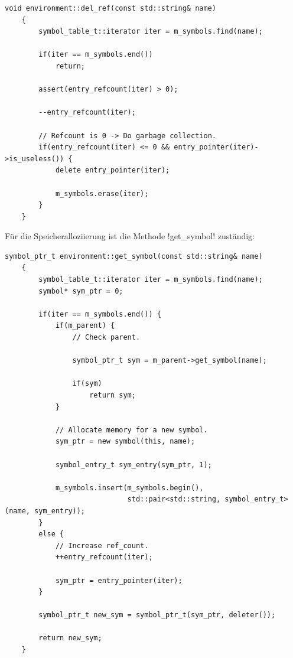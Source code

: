 \begin{lstlisting}[caption={Symbolbeseitigung}, label=lst:del_ref]
    void environment::del_ref(const std::string& name) 
    {
        symbol_table_t::iterator iter = m_symbols.find(name);

        if(iter == m_symbols.end())
            return;

        assert(entry_refcount(iter) > 0);

        --entry_refcount(iter);

        // Refcount is 0 -> Do garbage collection.
        if(entry_refcount(iter) <= 0 && entry_pointer(iter)->is_useless()) {
            delete entry_pointer(iter);

            m_symbols.erase(iter);
        }
    }
\end{lstlisting}


Für die Speicheralloziierung ist die Methode !get_symbol! zuständig:

\begin{lstlisting}[caption={Speicheralloziierung}, label=lst:get_symbol]
    symbol_ptr_t environment::get_symbol(const std::string& name)
    {
        symbol_table_t::iterator iter = m_symbols.find(name);
        symbol* sym_ptr = 0;

        if(iter == m_symbols.end()) {
            if(m_parent) {
                // Check parent.

                symbol_ptr_t sym = m_parent->get_symbol(name);

                if(sym)
                    return sym;
            }

            // Allocate memory for a new symbol.
            sym_ptr = new symbol(this, name);

            symbol_entry_t sym_entry(sym_ptr, 1);

            m_symbols.insert(m_symbols.begin(),
                             std::pair<std::string, symbol_entry_t>(name, sym_entry));
        }
        else {
            // Increase ref_count.
            ++entry_refcount(iter);

            sym_ptr = entry_pointer(iter);
        }

        symbol_ptr_t new_sym = symbol_ptr_t(sym_ptr, deleter());

        return new_sym;
    }
\end{lstlisting}
